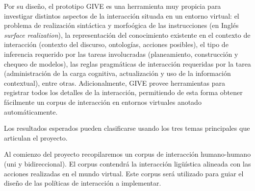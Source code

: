 
Por su dise\~no, el prototipo GIVE es una herramienta muy propicia para investigar distintos aspectos de la interacci\'on situada en un entorno virtual:
el problema de realizaci\'on sint\'actica y morfo\'ogica de las
instrucciones (en Ingl\'es \emph{surface realization}),
la representaci\'on del conocimiento existente en el contexto de
interacci\'on (contexto del discurso, ontolog\'ias, acciones posibles),
el tipo de inferencia requerido por las tareas involucradas
(planeamiento, construcci\'on y chequeo de modelos),
las reglas pragm\'aticas de interacci\'on requeridas por la tarea
(administraci\'on de la carga cognitiva, actualizaci\'on y uso de la informaci\'on contextual), entre otras. Adicionalmente, GIVE provee herramientas para registrar todos los detalles de la
interacci\'on, permitiendo de esta forma obtener f\'acilmente un corpus de interacci\'on en entornos virtuales anotado autom\'aticamente. 






Los resultados esperados pueden clasificarse usando los
tres temas principales que articulan el proyecto.


Al comienzo del proyecto recopilaremos
un corpus de interacci\'on humano-humano (uni y bidireccional).  El
corpus contendr\'a la interacci\'on lig\"u\'istica alineada con
las acciones realizadas en el mundo virtual.  Este corpus
ser\'a utilizado para guiar el dise\~no de las pol\'iticas
de interacci\'on a implementar.


%
%
%
%
%
%
%
%
%
%



